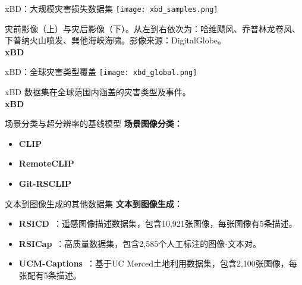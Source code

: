 \begin{refsection}
  \begin{frame}{xBD：大规模灾害损失数据集}
    \centering
    \texttt{[image: xbd\_samples.png]}
    
    \vspace{0.5em}
    \scriptsize
    灾前影像（上）与灾后影像（下）。从左到右依次为：哈维飓风、乔普林龙卷风、下普纳火山喷发、巽他海峡海啸。影像来源：DigitalGlobe。\\
    \textbf{xBD}~\parencite{guptaCreatingXBDDataset2019}
    \bottomleftrefs
  \end{frame}
\end{refsection}

\begin{refsection}
  \begin{frame}{xBD：全球灾害类型覆盖}
    \centering
    \texttt{[image: xbd\_global.png]}
    
    \vspace{0.5em}
    \scriptsize
    xBD 数据集在全球范围内涵盖的灾害类型及事件。\\
    \textbf{xBD}~\parencite{guptaCreatingXBDDataset2019}
    \bottomleftrefs
  \end{frame}
\end{refsection}

\begin{refsection}
  \begin{frame}{场景分类与超分辨率的基线模型}
    \textbf{场景图像分类：}
    \begin{itemize}
      \item \textbf{CLIP}~\parencite{radfordLearningTransferableVisual2021}
      \item \textbf{RemoteCLIP}~\parencite{liuRemoteCLIPVisionLanguage2024}
      \item \textbf{Git-RSCLIP}~\parencite{text2earth2025}
    \end{itemize}
    \bottomleftrefs
  \end{frame}
\end{refsection}

\begin{refsection}
  \begin{frame}{文本到图像生成的其他数据集}
    \textbf{文本到图像生成：}
    \begin{itemize}
      \item \textbf{RSICD}~\parencite{lu2017exploring}：遥感图像描述数据集，包含10,921张图像，每张图像有5条描述。
      \item \textbf{RSICap}~\parencite{hu2023rsgpt}：高质量数据集，包含2,585个人工标注的图像-文本对。
      \item \textbf{UCM-Captions}~\parencite{qu2016deep}：基于UC Merced土地利用数据集，包含2,100张图像，每张配有5条描述。
    \end{itemize}
    \bottomleftrefs
  \end{frame}
\end{refsection}

